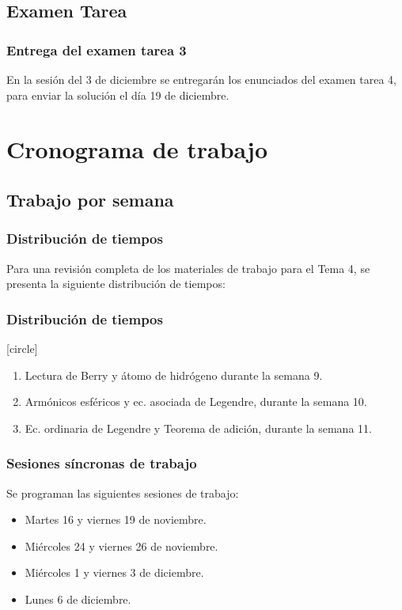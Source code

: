 \documentclass[12pt]{beamer}
\begin{document}
\subsection{Examen Tarea}

\begin{frame}
\frametitle{Entrega del examen tarea 3}
En la sesión del 3 de diciembre se entregarán los enunciados del examen tarea 4, \pause para enviar la solución el día 19 de diciembre.
\end{frame}



\section{Cronograma de trabajo}
\subsection{Trabajo por semana}

\begin{frame}
\frametitle{Distribución de tiempos}
Para una revisión completa de los materiales de trabajo para el Tema 4, se presenta la siguiente distribución de tiempos:
\end{frame}
\begin{frame}
\frametitle{Distribución de tiempos}
[circle]
\begin{enumerate}[<+->]
\item Lectura de Berry y átomo de hidrógeno durante la semana 9.
\item Armónicos esféricos y ec. asociada de Legendre, durante la semana 10.
\item Ec. ordinaria de Legendre y Teorema de adición, durante la semana 11.
\end{enumerate}
\end{frame}
\begin{frame}
\frametitle{Sesiones síncronas de trabajo}
Se programan las siguientes sesiones de trabajo:
\begin{itemize}[<+->]
\item Martes 16 y viernes 19 de noviembre.
\item Miércoles 24 y viernes 26 de noviembre.
\item Miércoles 1 y viernes 3 de diciembre.
\item Lunes 6 de diciembre.
\end{itemize}
\end{frame}
\end{document}
